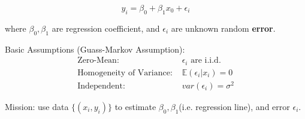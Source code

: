    \begin{equation}
        y_i=\beta_0+\beta_1x_0+\epsilon_i    
    \end{equation}

    where $\beta_0,\beta_1$ are regression coefficient, and $\epsilon_i$ are unknown random \textbf{error}. 
    
    Basic Assumptions (Guass-Markov Assumption):
    \begin{align*}
        \text{Zero-Mean: }&\epsilon_i\text{ are i.i.d.}\\
        \text{Homogeneity of Variance: }&\mathbb{E}(\epsilon_i|x_i)=0\\
        \text{Independent: }&var(\epsilon_i)=\sigma^2
    \end{align*}

    Mission: use data $\{(x_i,y_i)\}$ to estimate $\beta_0,\beta_1$(i.e. regression line), and error $\epsilon_i$.

